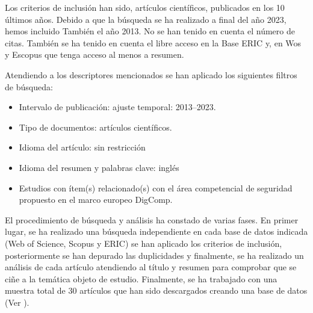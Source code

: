 \documentclass[spanish]{textolivre}
\begin{document}
Los criterios de inclusión han sido, artículos científicos, publicados en los 10 últimos años. Debido a que la búsqueda se ha realizado a final del año 2023, hemos incluido También el año 2013. No se han tenido en cuenta el número de citas. También se ha tenido en cuenta el libre acceso en la Base ERIC y, en Wos y Escopus que tenga acceso al menos a resumen.

Atendiendo a los descriptores mencionados se han aplicado los siguientes filtros de búsqueda:

\begin{itemize}
    \item Intervalo de publicación: ajuste temporal: 2013--2023.
    \item Tipo de documentos: artículos científicos.
    \item Idioma del artículo: sin restricción
    \item Idioma del resumen y palabras clave: inglés
    \item Estudios con ítem(s) relacionado(s) con el área competencial de seguridad propuesto en el marco europeo DigComp.
\end{itemize}

El procedimiento de búsqueda y análisis ha constado de varias fases. En primer lugar, se ha realizado una búsqueda independiente en cada base de datos indicada (Web of Science, Scopus y ERIC) se han aplicado los criterios de inclusión, posteriormente se han depurado las duplicidades y finalmente, se ha realizado un análisis de cada artículo atendiendo al título y resumen para comprobar que se ciñe a la temática objeto de estudio. Finalmente, se ha trabajado con una muestra total de 30 artículos que han sido descargados creando una base de datos (Ver ).
\end{document}
